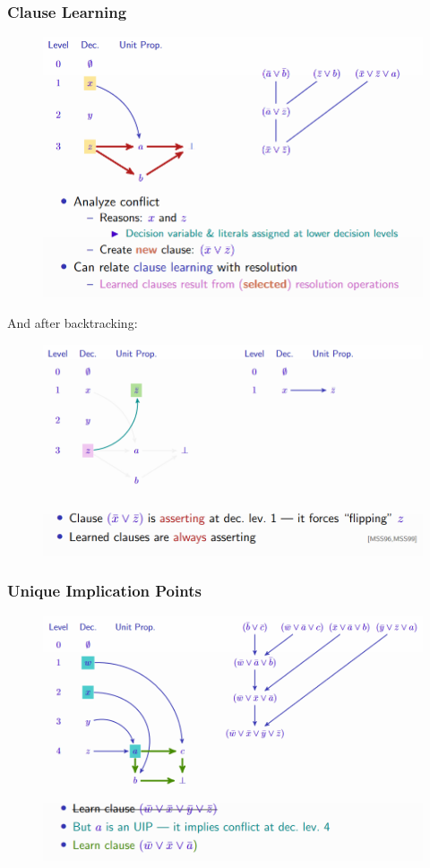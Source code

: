 \documentclass[10pt,a4paper]{report}
\begin{document}
\subsubsection{Clause Learning}
\begin{figure}[H]
    \centering
    \includegraphics[scale=0.5]{5.png}
\end{figure}
And after backtracking:
\begin{figure}[H]
    \centering
    \includegraphics[scale=0.5]{6.png}
\end{figure}
\subsubsection{Unique Implication Points}
\begin{figure}[H]
    \centering
    \includegraphics[scale=0.5]{7.png}
\end{figure}
\end{document}
